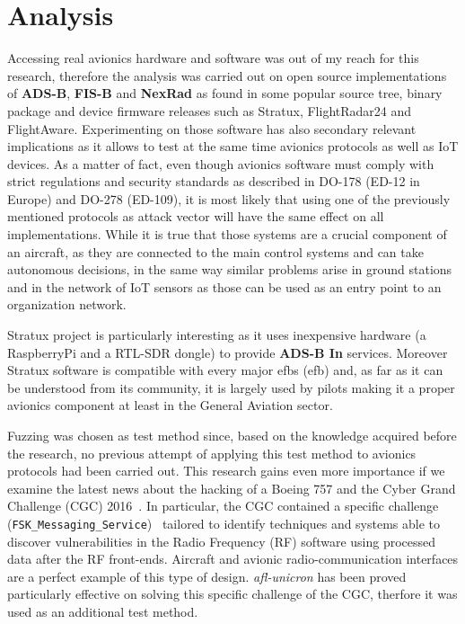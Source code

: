 \documentclass[../main.tex]{subfiles}
\begin{document}
\chapter{Analysis}
\label{chap:experimsetup}

Accessing real avionics hardware and software was out of my reach for this
research, therefore the analysis was carried out on open source implementations
of \textbf{ADS-B}, \textbf{FIS-B} and \textbf{NexRad} as found in some popular
source tree, binary package and device firmware releases such as Stratux,
FlightRadar24 and FlightAware. Experimenting on those software has also
secondary relevant implications as it allows to test at the same time avionics
protocols as well as IoT devices. As a matter of fact, even though avionics
software must comply with strict regulations and security standards as described
in DO-178 (ED-12 in Europe) and DO-278 (ED-109), it is most likely that using
one of the previously mentioned protocols as attack vector will have the same
effect on all implementations. While it is true that those systems are a crucial
component of an aircraft, as they are connected to the main control systems and
can take autonomous decisions, in the same way similar problems arise in ground
stations and in the network of IoT sensors as those can be used as an entry
point to an organization network.

Stratux project is particularly interesting as it uses inexpensive hardware (a
RaspberryPi and a RTL-SDR dongle) to provide \textbf{ADS-B In} services.
Moreover Stratux software is compatible with every major \acrlong{efb}s
(\acrshort{efb}) and, as far as it can be understood from its community, it is
largely used by pilots making it a proper avionics component at least in the
General Aviation sector.

Fuzzing was chosen as test method since, based on the knowledge acquired before
the research, no previous attempt of applying this test method to avionics
protocols had been carried out. This research gains even more importance if we
examine the latest news about the hacking of a Boeing 757 and the Cyber Grand
Challenge (CGC) 2016~\cite{CGC}. In particular, the CGC contained a specific
challenge (\texttt{FSK\_Messaging\_Service})~\cite{CGC-FSK} tailored to identify
techniques and systems able to discover vulnerabilities in the Radio Frequency
(RF) software using processed data after the RF front-ends. Aircraft and avionic
radio-communication interfaces are a perfect example of this type of design.
\textit{afl-unicron} has been proved particularly effective on solving this
specific challenge of the CGC, therfore it was used as an additional test
method.
\end{document}
